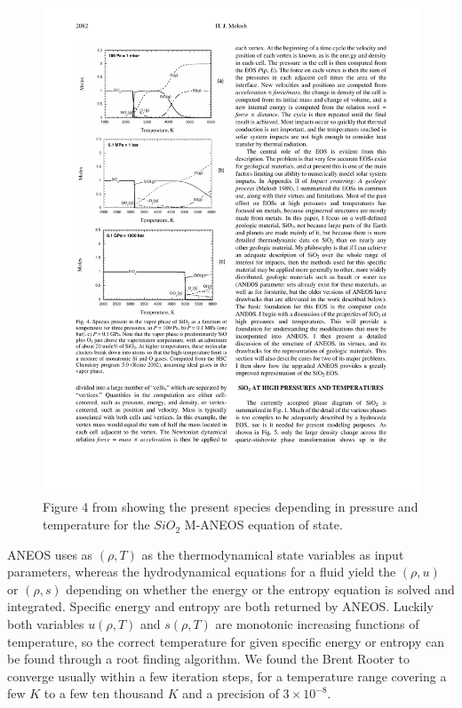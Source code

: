 \begin{figure}
\includegraphics[scale=1.0]{05aneos_phases03}
\caption{Figure 4 from \cite{Melosh:2007p3502} showing the present species depending in pressure and temperature for the $SiO_2$ M-ANEOS equation of state.}
\label{ch02_eos02_fig05}
\end{figure}

ANEOS uses as $(\rho, T)$ as the thermodynamical state variables as input parameters, whereas the hydrodynamical equations for a fluid yield the $(\rho, u)$ or $(\rho, s)$ depending on whether the energy or the entropy equation is solved and integrated. Specific energy and entropy are both returned by ANEOS. Luckily both variables $u(\rho, T)$ and  $s(\rho, T)$ are monotonic increasing functions of temperature, so the correct temperature for given specific energy or entropy can be found through a root finding algorithm. We found the Brent Rooter \cite{Press2002nrc..book.....P} to converge usually within a few iteration steps, for a temperature range covering a few $K$ to a few ten thousand $K$ and a precision of $3 \times 10^{-8}$.

